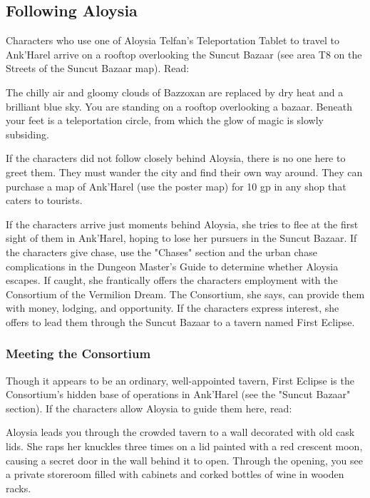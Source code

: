 \documentclass[10pt,a4paper,twoside,bg=print,twocolumn,openany,nodeprecatedcode]{dndbook}
\begin{document}
\subsection{Following Aloysia}
Characters who use one of Aloysia Telfan's Teleportation Tablet to travel to Ank'Harel arrive on a rooftop overlooking the Suncut Bazaar (see area T8 on the Streets of the Suncut Bazaar map). Read:

\begin{DndReadAloud}{}
The chilly air and gloomy clouds of Bazzoxan are replaced by dry heat and a brilliant blue sky. You are standing on a rooftop overlooking a bazaar. Beneath your feet is a teleportation circle, from which the glow of magic is slowly subsiding.

\end{DndReadAloud}

If the characters did not follow closely behind Aloysia, there is no one here to greet them. They must wander the city and find their own way around. They can purchase a map of Ank'Harel (use the poster map) for 10 gp in any shop that caters to tourists.

If the characters arrive just moments behind Aloysia, she tries to flee at the first sight of them in Ank'Harel, hoping to lose her pursuers in the Suncut Bazaar. If the characters give chase, use the "Chases" section and the urban chase complications in the Dungeon Master's Guide to determine whether Aloysia escapes. If caught, she frantically offers the characters employment with the Consortium of the Vermilion Dream. The Consortium, she says, can provide them with money, lodging, and opportunity. If the characters express interest, she offers to lead them through the Suncut Bazaar to a tavern named First Eclipse.

\subsubsection{Meeting the Consortium}
Though it appears to be an ordinary, well-appointed tavern, First Eclipse is the Consortium's hidden base of operations in Ank'Harel (see the "Suncut Bazaar" section). If the characters allow Aloysia to guide them here, read:

\begin{DndReadAloud}{}
Aloysia leads you through the crowded tavern to a wall decorated with old cask lids. She raps her knuckles three times on a lid painted with a red crescent moon, causing a secret door in the wall behind it to open. Through the opening, you see a private storeroom filled with cabinets and corked bottles of wine in wooden racks.

\end{DndReadAloud}
\end{document}
